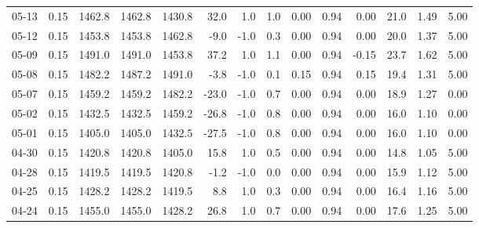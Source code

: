 \begin{threeparttable}
{\begin{tabular}{lrrrrrrrrrrrrr}
  05-13 &     0.15 & 1462.8 & 1462.8 & 1430.8 &       32.0 &                      1.0 &                 1.0 &       0.00 &      0.94 &           0.00 &             21.0 &            1.49 &                   5.00 \\
  05-12 &     0.15 & 1453.8 & 1453.8 & 1462.8 &       -9.0 &                     -1.0 &                 0.3 &       0.00 &      0.94 &           0.00 &             20.0 &            1.37 &                   5.00 \\
  05-09 &     0.15 & 1491.0 & 1491.0 & 1453.8 &       37.2 &                      1.0 &                 1.1 &       0.00 &      0.94 &          -0.15 &             23.7 &            1.62 &                   5.00 \\
  05-08 &     0.15 & 1482.2 & 1487.2 & 1491.0 &       -3.8 &                     -1.0 &                 0.1 &       0.15 &      0.94 &           0.15 &             19.4 &            1.31 &                   5.00 \\
  05-07 &     0.15 & 1459.2 & 1459.2 & 1482.2 &      -23.0 &                     -1.0 &                 0.7 &       0.00 &      0.94 &           0.00 &             18.9 &            1.27 &                   0.00 \\
  05-02 &     0.15 & 1432.5 & 1432.5 & 1459.2 &      -26.8 &                     -1.0 &                 0.8 &       0.00 &      0.94 &           0.00 &             16.0 &            1.10 &                   0.00 \\
  05-01 &     0.15 & 1405.0 & 1405.0 & 1432.5 &      -27.5 &                     -1.0 &                 0.8 &       0.00 &      0.94 &           0.00 &             16.0 &            1.10 &                   0.00 \\
  04-30 &     0.15 & 1420.8 & 1420.8 & 1405.0 &       15.8 &                      1.0 &                 0.5 &       0.00 &      0.94 &           0.00 &             14.8 &            1.05 &                   5.00 \\
  04-28 &     0.15 & 1419.5 & 1419.5 & 1420.8 &       -1.2 &                     -1.0 &                 0.0 &       0.00 &      0.94 &           0.00 &             15.9 &            1.12 &                   5.00 \\
  04-25 &     0.15 & 1428.2 & 1428.2 & 1419.5 &        8.8 &                      1.0 &                 0.3 &       0.00 &      0.94 &           0.00 &             16.4 &            1.16 &                   5.00 \\
  04-24 &     0.15 & 1455.0 & 1455.0 & 1428.2 &       26.8 &                      1.0 &                 0.7 &       0.00 &      0.94 &           0.00 &             17.6 &            1.25 &                   5.00 \\

\end{tabular}}
\end{threeparttable}
